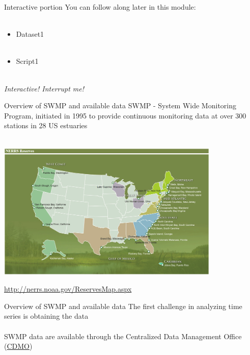 \documentclass[xcolor=svgnames]{beamer}\usepackage[]{graphicx}\usepackage[]{color}
\begin{document}
\begin{frame}{Interactive portion}
You can follow along later in this module: \\~\\
\begin{itemize}
\item Dataset1 \\~\\
\item Script1 \\~\\
\end{itemize}
\Large
\centerline{\emph{Interactive! Interrupt me!}}
\end{frame}

\begin{frame}{Overview of SWMP and available data}
SWMP - System Wide Monitoring Program, initiated in 1995 to provide continuous monitoring data at over 300 stations in 28 US estuaries \\~\\
\centerline{\includegraphics[width = 0.8\textwidth]{NERRS_locations.png}}
\tiny
\flushright
\href{http://nerrs.noaa.gov/ReservesMap.aspx}{http://nerrs.noaa.gov/ReservesMap.aspx}
\end{frame}

\begin{frame}{Overview of SWMP and available data}
The first challenge in analyzing time series is obtaining the data \\~\\
SWMP data are available through the Centralized Data Management Office (\href{http://cdmo.baruch.sc.edu/}{CDMO})
\begin{center}
\end{center}

\end{frame}
\end{document}
